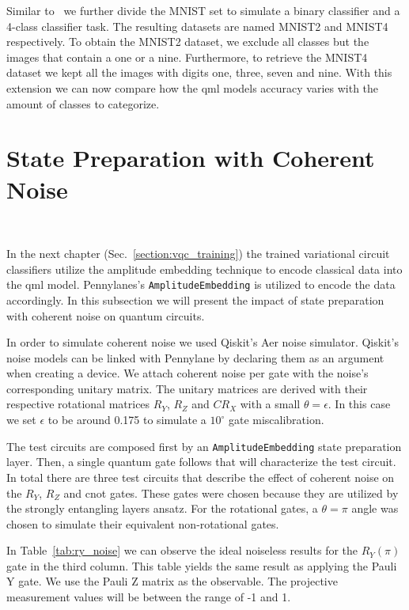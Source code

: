 Similar to~\cite{winderl_quantum_2023} we further divide the MNIST
set to simulate a binary classifier and a 4-class classifier task. The
resulting datasets are named MNIST2 and MNIST4 respectively. To obtain
the MNIST2 dataset, we exclude all classes but the images that contain
a one or a nine. Furthermore, to retrieve the MNIST4 dataset we kept
all the images with digits one, three, seven and nine. With this extension
we can now compare how the \ac{qml} models accuracy varies with the
amount of classes to categorize. \

\section{State Preparation with Coherent Noise}\label{section:state_preparation_noise} \

In the next chapter (Sec.~\ref{section:vqc_training}) the trained variational circuit classifiers
utilize the amplitude embedding technique to encode classical data
into the \ac{qml} model. Pennylanes's \colorbox{inline_gray}{\lstinline|AmplitudeEmbedding|}
is utilized to encode the data accordingly. In this subsection we will
present the impact of state preparation with coherent noise on quantum
circuits. \

In order to simulate coherent noise we used Qiskit's Aer noise simulator.
Qiskit's noise models can be linked with Pennylane by declaring them as
an argument when creating a device. We attach coherent noise per gate
with the noise's corresponding unitary matrix. The unitary matrices are
derived with their respective rotational matrices \(R_{Y}\), \(R_{Z}\) and 
\(CR_{X}\) with a small \(\theta = \epsilon\). In this case we set 
\(\epsilon\) to be around 0.175 to simulate a \(10^{\circ}\) gate
miscalibration. \

The test circuits are composed first by an
\colorbox{inline_gray}{\lstinline|AmplitudeEmbedding|} state preparation
layer. Then, a single quantum gate follows that will characterize the
test circuit. In total there are three test circuits that describe the
effect of coherent noise on the \(R_{Y}\), \(R_{Z}\) and \ac{cnot} gates.
These gates were chosen because they are utilized by the strongly
entangling layers ansatz. For the rotational gates, a \(\theta = \pi\)
angle was chosen to simulate their equivalent non-rotational gates. \

In Table~\ref{tab:ry_noise} we can observe the ideal noiseless results
for the \(R_{Y}(\pi)\) gate in the third column. This table yields the
same result as applying the Pauli Y gate. We use the Pauli Z matrix as
the observable. The projective measurement values will be between the
range of -1 and 1. \


